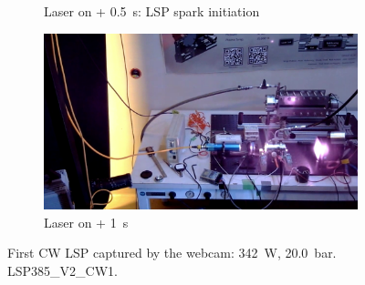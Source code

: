 \begin{figure}[!ht]
\begin{subfigure}[t]{0.45\textwidth}
        \caption{Laser on + \qty{0.5}{s}: LSP spark initiation}
        \label{fig:CW_V2_webcam_frames_LSP}
    \end{subfigure}
    \hfill
    \begin{subfigure}[t]{0.45\textwidth}
        \centering
        \includegraphics[width=\textwidth]{assets/4 experiments/CW LSP frames webcam/After LSP.png}
        \caption{Laser on + \qty{1}{s}}
    \end{subfigure}
    \caption{First CW LSP captured by the webcam: \qty{342}{W}, \qty{20.0}{bar}. LSP385\_V2\_CW1.}
    \label{fig:CW_V2_webcam_frames}
\end{figure}
